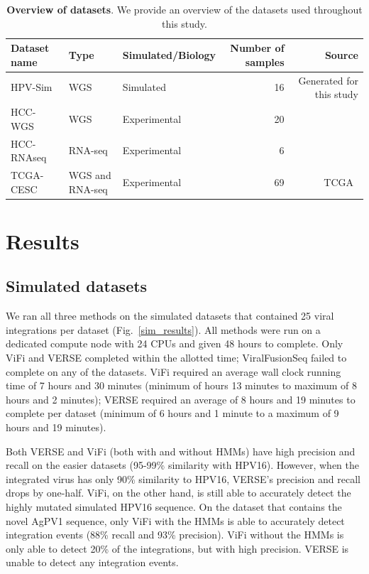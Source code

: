 \documentclass{bioinfo}
\begin{document}
\begin{table}[htb]
\centering
\caption{\textbf{Overview of datasets}.  We provide an overview of the datasets used throughout this study.  }
\label{table:data}
\begin{tabular}{|l|l|l|r|r|}
\hline
Dataset name & Type & Simulated/Biology & Number of samples & Source \\ \hline
HPV-Sim & WGS &Simulated& 16 & Generated for this study \\ \hline
HCC-WGS & WGS & Experimental&20 & ~\cite{Sung2012} \\ \hline
HCC-RNAseq & RNA-seq & Experimental&6 & ~\cite{Lau2014} \\ \hline
TCGA-CESC & WGS and RNA-seq &Experimental& 69 & TCGA~\cite{TODO} \\ \hline 
\end{tabular}
\end{table}
\section{Results}

\subsection{Simulated datasets}
We ran all three methods on the simulated datasets that contained 25 viral integrations per dataset (Fig.~\ref{sim_results}).  All methods were run on a dedicated compute node with 24 CPUs and given 48 hours to complete.  Only ViFi and VERSE completed within the allotted time; ViralFusionSeq failed to complete on any of the datasets.  ViFi required an average wall clock running time of 7 hours and 30 minutes (minimum of hours 13 minutes to maximum of 8 hours and 2 minutes); VERSE required an average of 8 hours and 19 minutes to complete per dataset (minimum of 6 hours and 1 minute to a maximum of 9 hours and 19 minutes).  

Both VERSE and ViFi (both with and without HMMs) have high precision and recall on the easier datasets (95-99\% similarity with HPV16).  However, when the integrated virus has only 90\% similarity to HPV16, VERSE's precision and recall drops by one-half.  ViFi, on the other hand, is still able to accurately detect the highly mutated simulated HPV16 sequence.  On the dataset that contains the novel AgPV1 sequence, only ViFi with the HMMs is able to accurately detect integration events (88\% recall and 93\% precision).  ViFi without the HMMs is only able to detect 20\% of the integrations, but with high precision.  VERSE is unable to detect any integration events.  
\end{document}
